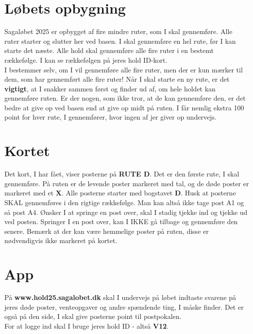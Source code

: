\section{Løbets opbygning}
Sagaløbet 2025 er opbygget af fire mindre ruter, som I skal gennemføre. Alle ruter starter og slutter her ved basen. I skal gennemføre en hel rute, før I kan starte det næste. Alle hold skal gennemføre alle fire ruter i en bestemt rækkefølge. I kan se rækkefølgen på jeres hold ID-kort.\\\newline
I bestemmer selv, om I vil gennemføre alle fire ruter, men der er kun mærker til dem, som har gennemført alle fire ruter! Når I skal starte en ny rute, er det \textbf{vigtigt}, at I snakker sammen først og finder ud af, om hele holdet kan gennemføre ruten. Er der nogen, som ikke tror, at de kan gennemføre den, er det bedre at give op ved basen end at give op midt på ruten. I får nemlig ekstra 100 point for hver rute, I gennemfører, hvor ingen af jer giver op undervejs.\\
\section{Kortet}
Det kort, I har fået, viser posterne på \textbf{RUTE D}. Det er den første rute, I skal gennemføre. På ruten er de levende poster markeret med tal, og de døde poster er markeret med et \textbf{X}. Alle posterne starter med bogstavet \textbf{D}. Husk at posterne SKAL gennemføres i den rigtige rækkefølge. Man kan altså ikke tage post A1 og så post A4. Ønsker I at springe en post over, skal I stadig tjekke ind og tjekke ud ved posten. Springer I en post over, kan I IKKE gå tilbage og gennemføre den senere. Bemærk at der kan være hemmelige poster på ruten, disse er nødvendigvis ikke markeret på kortet.
\section{App}
På \textbf{www.hold25.sagalobet.dk} skal I undervejs på løbet indtaste svarene på jeres døde poster, venteopgaver og andre spændende ting, I måske finder. Det er også på den side, I skal give posterne point til postpokalen.\\
For at logge ind skal I bruge jeres hold ID - altså \textbf{V12}.
\newpage
